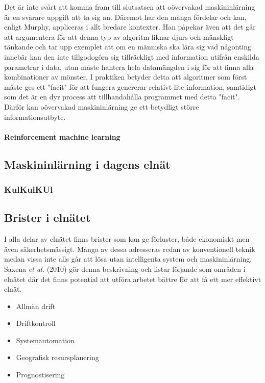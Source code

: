 \documentclass[a4paper]{article}
\begin{document}
Det är inte svårt att komma fram till slutsatsen att oövervakad maskininlärning är en svårare uppgift att ta sig an. Däremot har den många fördelar och kan, enligt Murphy, appliceras i allt bredare kontexter. Han påpekar även att det går att argumentera för att denna typ av algoritm liknar djurs och mänskligt tänkande och tar upp exemplet att om en människa ska lära sig vad någonting innebär kan den inte tillgodogöra sig tillräckligt med information utifrån enskilda parametrar i data, utan måste hantera hela datamängden i sig för att finna alla kombinationer av mönster. I praktiken betyder detta att algoritmer som först måste ges ett "facit" för att fungera genererar relativt lite information, samtidigt som det är en dyr process att tillhandahålla programmet med detta "facit". Därför kan oövervakad maskininlärning ge ett betydligt större informationsutbyte. 


\paragraph{Reinforcement machine learning}




\clearpage



\subsection{Maskininlärning i dagens elnät}

\subsubsection{KulKulKUl}

\clearpage



\subsection{Brister i elnätet}

I alla delar av elnätet finns brister som kan ge förluster, både ekonomiskt men även säkerhetsmässigt. Många av dessa adresseras redan av konventionell teknik medan vissa inte alls går att lösa utan intelligenta system och maskininlärning. Saxena \emph{et al.} (2010) gör denna beskrivning och listar följande som områden i elnätet där det finns potential att utföra arbetet bättre för att få ett mer effektivt elnät.

\begin{itemize}
	\item Allmän drift
    \item Driftkontroll
    \item Systemautomation
    \item Geografisk resursplanering
    \item Prognostisering   
\end{itemize}
\end{document}
